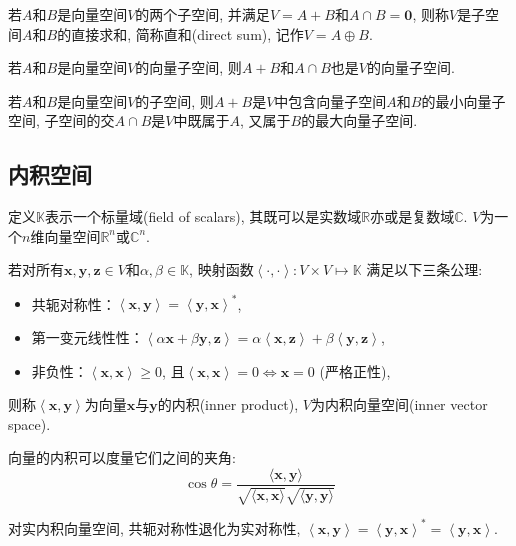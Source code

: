 \documentclass[lang=cn,10pt]{gorgeousnbook}
\numberwithin{equation}{section}%
\numberwithin{figure}{section}%
\begin{document}
\begin{definition}
若$A$和$B$是向量空间$V$的两个子空间, 并满足$V=A+B$和$A\cap B={\boldsymbol{0}}$, 则称$V$是子空间$A$和$B$的直接求和, 简称直和(direct sum), 记作$V=A\oplus B$.
\end{definition}

\begin{theorem}
若$A$和$B$是向量空间$V$的向量子空间, 则$A+B$和$A\cap B$也是$V$的向量子空间. 
\end{theorem}

\begin{note}
若$A$和$B$是向量空间$V$的子空间, 则$A+B$是$V$中包含向量子空间$A$和$B$的最小向量子空间, 子空间的交$A\cap B$是$V$中既属于$A$, 又属于$B$的最大向量子空间. 
\end{note}



\subsection{内积空间}
定义$\mathbb{K}$表示一个标量域(field of scalars), 其既可以是实数域$\mathbb{R}$亦或是复数域$\mathbb{C}$. $V$为一个$n$维向量空间$\mathbb{R}^n$或$\mathbb{C}^n$.

\begin{definition}[内积与内积向量空间]
若对所有$\bm{x},\bm{y},\bm{z}\in V$和$\alpha,\beta\in \mathbb{K}$, 映射函数$\left< \cdot ,\cdot \right> :V\times V\mapsto \mathbb{K} $ 满足以下三条公理:
\begin{itemize}
\item 共轭对称性：$\left< \boldsymbol{x},\boldsymbol{y} \right> =\left< \boldsymbol{y},\boldsymbol{x} \right> ^*$, 
\item 第一变元线性性：$\left< \alpha \boldsymbol{x}+\beta \boldsymbol{y},\boldsymbol{z} \right> =\alpha \left< \boldsymbol{x},\boldsymbol{z} \right> +\beta \left< \boldsymbol{y},\boldsymbol{z} \right> $,
\item 非负性：$\left< \boldsymbol{x},\boldsymbol{x} \right> \geqslant 0$, 且$\left< \boldsymbol{x},\boldsymbol{x} \right> =0\Leftrightarrow \boldsymbol{x}=0$ (严格正性), 
\end{itemize}
则称$\left< \bm{x} ,\bm{y} \right>$为向量$\bm{x}$与$\bm{y}$的内积(inner product), $V$为内积向量空间(inner vector space).
\end{definition}
向量的内积可以度量它们之间的夹角:
\begin{equation}
\cos\theta=\frac{\langle\boldsymbol{x},\boldsymbol{y}\rangle}{\sqrt{\langle\boldsymbol{x},\boldsymbol{x}\rangle}\sqrt{\langle\boldsymbol{y},\boldsymbol{y}\rangle}}
\end{equation}
\begin{note}
对实内积向量空间, 共轭对称性退化为实对称性, $\left< \boldsymbol{x},\boldsymbol{y} \right> =\left< \boldsymbol{y},\boldsymbol{x} \right> ^*=\left< \boldsymbol{y},\boldsymbol{x} \right> $.
\end{note}
\end{document}
